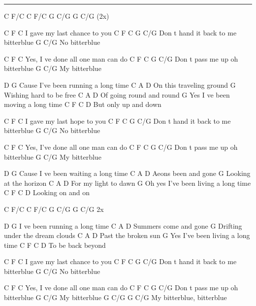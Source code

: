 \noindent\rule{\columnwidth}{1pt}

\begin{multicols}{2}
\begin{lstsong}
C F/C  C F/C  G C/G  G C/G (2x)

C         F    C
I gave my last chance to you
C             F       C        G C/G       
Don t hand it back to me bitterblue
            G C/G
No bitterblue

C                  F   C
Yes, I ve done all one man can do
C             F  C        G C/G
Don t pass me up oh bitterblue
             G C/G
My bitterblue

D                         G
Cause I've been running a long time
C                 A     D
On this traveling ground
                   G
Wishing hard to be free
   C               A    D
Of going round and round
                       G
Yes I ve been moving a long time
    C           F C  D
But only up and down

C         F    C
I gave my last hope to you
C             F       C        G C/G       
Don t hand it back to me bitterblue
            G C/G
No bitterblue

C                  F   C
Yes, I've done all one man can do
C             F  C        G C/G
Don t pass me up oh bitterblue
             G C/G
My bitterblue

D                         G
Cause I ve been waiting a long time
C              A   D
Aeons been and gone 
               G
Looking at the horizon
       C        A   D
For my light to dawn
                          G
Oh yes I've been living a long time
C       F  C   D
Looking on and on

C F/C  C F/C  G C/G  G C/G 2x

D                   G
I ve been running a long time
C       A        D
Summers come and gone
                   G
Drifting under the dream clouds
         C      A  D
Past the broken sun 
                       G
Yes I've been living a long time
C     F    C  D
To be back beyond

C         F    C
I gave my last chance to you
C             F       C        G C/G       
Don t hand it back to me bitterblue
            G C/G
No bitterblue

C                  F   C
Yes, I ve done all one man can do
C             F  C        G C/G
Don t pass me up oh bitterblue
             G C/G
My bitterblue
            G C/G       G C/G
My bitterblue, bitterblue
\end{lstsong}
\end{multicols}
\newpage


